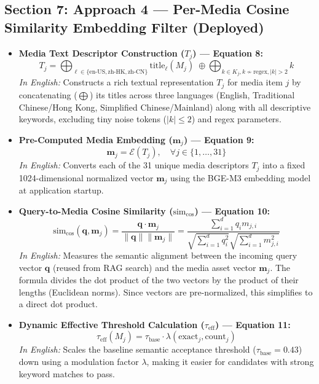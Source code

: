 \documentclass{article}
\begin{document}
\subsection{Section 7: Approach 4 --- Per-Media Cosine Similarity Embedding Filter (Deployed)}
\begin{itemize}
    \item \textbf{Media Text Descriptor Construction ($T_j$) --- Equation 8:}
    $$T_j = \bigoplus_{\ell \in \{\text{en-US}, \text{zh-HK}, \text{zh-CN}\}} \text{title}_\ell(M_j) \;\oplus \bigoplus_{k \in K_j, k \not\sim \text{regex}, |k| > 2} k$$
    \textit{In English:} Constructs a rich textual representation $T_j$ for media item $j$ by concatenating ($\bigoplus$) its titles across three languages (English, Traditional Chinese/Hong Kong, Simplified Chinese/Mainland) along with all descriptive keywords, excluding tiny noise tokens ($|k| \leq 2$) and regex parameters.

    \item \textbf{Pre-Computed Media Embedding ($\mathbf{m}_j$) --- Equation 9:}
    $$\mathbf{m}_j = \mathcal{E}(T_j), \quad \forall j \in \{1, \dots, 31\}$$
    \textit{In English:} Converts each of the 31 unique media descriptors $T_j$ into a fixed 1024-dimensional normalized vector $\mathbf{m}_j$ using the BGE-M3 embedding model at application startup.

    \item \textbf{Query-to-Media Cosine Similarity ($\text{sim}_{\text{cos}}$) --- Equation 10:}
    $$\text{sim}_{\text{cos}}(\mathbf{q}, \mathbf{m}_j) = \frac{\mathbf{q} \cdot \mathbf{m}_j}{\|\mathbf{q}\| \|\mathbf{m}_j\|} = \frac{\sum_{i=1}^d q_i m_{j,i}}{\sqrt{\sum_{i=1}^d q_i^2} \sqrt{\sum_{i=1}^d m_{j,i}^2}}$$
    \textit{In English:} Measures the semantic alignment between the incoming query vector $\mathbf{q}$ (reused from RAG search) and the media asset vector $\mathbf{m}_j$. The formula divides the dot product of the two vectors by the product of their lengths (Euclidean norms). Since vectors are pre-normalized, this simplifies to a direct dot product.

    \item \textbf{Dynamic Effective Threshold Calculation ($\tau_{\text{eff}}$) --- Equation 11:}
    $$\tau_{\text{eff}}(M_j) = \tau_{\text{base}} \cdot \lambda(\text{exact}_j, \text{count}_j)$$
    \textit{In English:} Scales the baseline semantic acceptance threshold ($\tau_{\text{base}} = 0.43$) down using a modulation factor $\lambda$, making it easier for candidates with strong keyword matches to pass.


\end{itemize}
\end{document}
